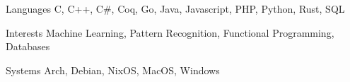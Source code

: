 
\begin{cvskills}
    \cvskill
        {Languages}
        {C, C++, C#, Coq, Go, Java, Javascript, PHP, Python, Rust, SQL}

    \cvskill
        {Interests}
        {Machine Learning, Pattern Recognition, Functional Programming, Databases}

    \cvskill
        {Systems}
        {Arch, Debian, NixOS, MacOS, Windows}
\end{cvskills}
